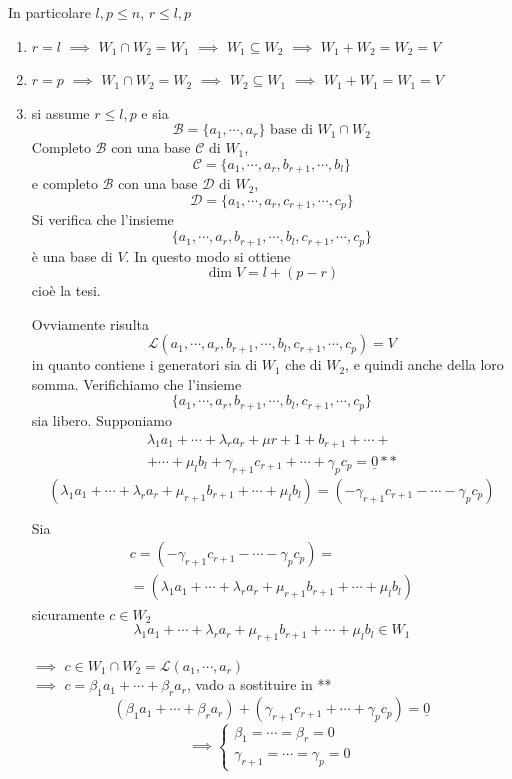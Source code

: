 \documentclass[twoside, 11pt, titlepage]{article}
\begin{document}
In particolare $ l,p \leq n $, $ r\leq l,p $
\begin{enumerate}
    \item $ r=l $ $\implies$ $ W_1 \cap W_2 = W_1 $ $\implies$ $ W_1 \subseteq W_2 $ $\implies$ $ W_1+W_2=W_2=V $ %
    \item $ r=p $ $\implies$ $ W_1 \cap W_2 = W_2 $ $\implies$ $ W_2 \subseteq W_1 $ $\implies$ $ W_1+W_1=W_1=V $ %
    \item si assume $ r\leq l,p $ e sia \[\mathscr{B}=\{a_1,\cdots,a_r\} \text{ base di } W_1 \cap W_2\]
    Completo $ \mathscr{B} $ con una base $ \mathscr{C} $ di $ W_1 $, \[\mathscr{C}=\{a_1, \cdots, a_r, b_{r+1}, \cdots, b_l\}\]e completo $ \mathscr{B} $ con una base $ \mathscr{D} $ di $ W_2 $, \[\mathscr{D}=\{a_1, \cdots, a_r, c_{r+1}, \cdots, c_p\}\]
    Si verifica che l'insieme \[\{a_1, \cdots, a_r, b_{r+1}, \cdots, b_l, c_{r+1}, \cdots, c_p\}\] è una base di $V$. In questo modo si ottiene \[\dim V= l + (p-r)\] cioè la tesi.
    
    Ovviamente risulta \[\mathscr{L}(a_1, \cdots, a_r, b_{r+1}, \cdots, b_l, c_{r+1}, \cdots, c_p)=V\] in quanto contiene i generatori sia di $W_1$ che di $W_2$, e quindi anche della loro somma. Verifichiamo che l'insieme \[\{a_1, \cdots, a_r, b_{r+1}, \cdots, b_l, c_{r+1}, \cdots, c_p\}\] sia libero.
    Supponiamo 
    \begin{multline*}\lambda_1a_1+ \cdots + \lambda_r a_r + \mu{r+1}+b_{r+1} + \cdots + \\ + \cdots + \mu_lb_l + \gamma_{r+1} c_{r+1} + \cdots + \gamma_p c_p = \underline{0}**\end{multline*}
    \[(\lambda_1a_1+ \cdots + \lambda_r a_r + \mu_{r+1} b_{r+1} + \cdots + \mu_l b_l)=( -\gamma_{r+1} c_{r+1} - \cdots - \gamma_p c_p)\]
    
    Sia \begin{multline*}c=(-\gamma_{r+1} c_{r+1} - \cdots - \gamma_p c_p)=\\=(\lambda_1a_1+ \cdots + \lambda_r a_r + \mu_{r+1} b_{r+1} + \cdots + \mu_l b_l)\end{multline*} sicuramente $c \in W_2$
    \[\lambda_1 a_1+ \cdots + \lambda_r a_r + \mu_{r+1} b_{r+1} + \cdots + \mu_l b_l \in W_1\] 
    
    $\implies$ $c \in W_1 \cap W_2 = \mathscr{L}(a_1,\cdots, a_r)$ \\
    
    $\implies$ $c = \beta_1 a_1 +\cdots+\beta_r a_r$, vado a sostituire in **
    \[(\beta_1 a_1 +\cdots+\beta_r a_r)+(\gamma_{r+1} c_{r+1} + \cdots + \gamma_p c_p) = \underline{0}\]
    \[\implies \begin{cases}
    	\beta_1=\cdots=\beta_r=0\\
    	\gamma_{r+1}=\cdots=\gamma_p=0
    \end{cases}\]	%


\end{enumerate}
\end{document}
